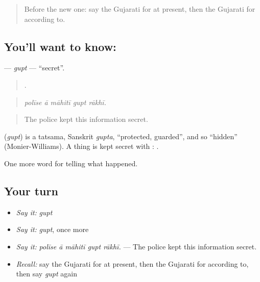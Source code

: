 \label{lesson:GU-C316-gupt}



\begin{quote}
Before the new one: say the Gujarati for at present, then the Gujarati for according to.
\end{quote}

\subsection*{You'll want to know: }
\textbf{} — \emph{gupt} — \textquotedblleft{}secret\textquotedblright{}.

\begin{quote}
    .
\end{quote}

\begin{quote}
\emph{polīse ā māhitī gupt rākhī.}
\end{quote}

\begin{quote}
The police kept this information secret.
\end{quote}

\begin{cousinweb}
\textbf{} (\emph{gupt}) is a tatsama, Sanskrit \emph{gupta}, \textquotedblleft{}protected, guarded\textquotedblright{}, and so \textquotedblleft{}hidden\textquotedblright{} (Monier-Williams). A thing is kept secret with \textbf{}: \textbf{ }.
\end{cousinweb}

\begin{grammarlens}[title={What you've built}]
One more word for telling what happened.
\end{grammarlens}

\subsection*{Your turn}
\begin{itemize}
\raggedright
  \item \emph{Say it:} \emph{gupt}
  \item \emph{Say it:} \emph{gupt}, once more
  \item \emph{Say it:} \emph{polīse ā māhitī gupt rākhī.} — The police kept this information secret.
  \item \emph{Recall:} say the Gujarati for at present, then the Gujarati for according to, then say \emph{gupt} again
\end{itemize}

